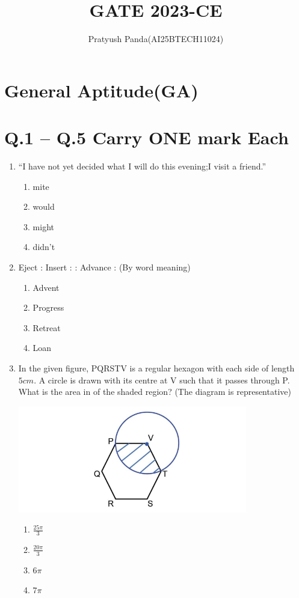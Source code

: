 \documentclass{exam}
\begin{document}
\title{GATE 2023-CE}
\author{Pratyush Panda(AI25BTECH11024)}
\maketitle
\bigskip
\renewcommand{\thefigure}{\theenumi}
\renewcommand{\thetable}{\theenumi}

\section*{General Aptitude(GA)}
\section*{Q.1 – Q.5 Carry ONE mark Each}
\vspace{1cm}
\begin{enumerate}
\item “I have not yet decided what I will do this  evening;I\underline{\hspace{2cm}} visit a friend.”
\begin{enumerate}
    \item mite
    \item would
    \item might
    \item didn't
\end{enumerate}
\vspace{0.5cm}
\item Eject : Insert : : Advance : \underline{\hspace{2cm}}
(By word meaning)
\begin{enumerate}
    \item Advent
    \item Progress
    \item Retreat
    \item Loan
\end{enumerate}
\vspace{0.5cm}
\item In the given figure, PQRSTV is a regular hexagon with each side of length $5 cm$. A
circle is drawn with its centre at V such that it passes through P. What is the area in  of the shaded region? (The diagram is representative)

\includegraphics[width=10cm]{pics/Screenshot 2025-08-02 104931.png}
\begin{enumerate}
    \item \Large$\frac{25\pi}{3}$
    \item \Large$\frac{20\pi}{3}$
    \item \Large$6\pi$
    \item \Large$7\pi$
\end{enumerate}
\vspace{0.5cm}


\end{enumerate}
\end{document}
